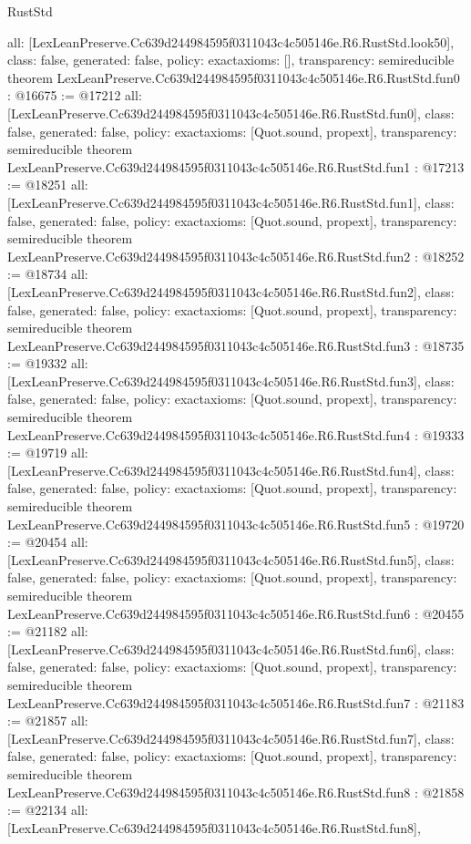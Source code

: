\begin{lexlean}{RustStd}
\begin{coremodule}
{  all: [LexLeanPreserve.Cc639d244984595f0311043c4c505146e.R6.RustStd.look50],
  class: false,
  generated: false,
  policy: exact{axioms: []},
  transparency: semireducible
}
theorem LexLeanPreserve.Cc639d244984595f0311043c4c505146e.R6.RustStd.fun0 : @16675 := @17212 {
  all: [LexLeanPreserve.Cc639d244984595f0311043c4c505146e.R6.RustStd.fun0],
  class: false,
  generated: false,
  policy: exact{axioms: [Quot.sound, propext]},
  transparency: semireducible
}
theorem LexLeanPreserve.Cc639d244984595f0311043c4c505146e.R6.RustStd.fun1 : @17213 := @18251 {
  all: [LexLeanPreserve.Cc639d244984595f0311043c4c505146e.R6.RustStd.fun1],
  class: false,
  generated: false,
  policy: exact{axioms: [Quot.sound, propext]},
  transparency: semireducible
}
theorem LexLeanPreserve.Cc639d244984595f0311043c4c505146e.R6.RustStd.fun2 : @18252 := @18734 {
  all: [LexLeanPreserve.Cc639d244984595f0311043c4c505146e.R6.RustStd.fun2],
  class: false,
  generated: false,
  policy: exact{axioms: [Quot.sound, propext]},
  transparency: semireducible
}
theorem LexLeanPreserve.Cc639d244984595f0311043c4c505146e.R6.RustStd.fun3 : @18735 := @19332 {
  all: [LexLeanPreserve.Cc639d244984595f0311043c4c505146e.R6.RustStd.fun3],
  class: false,
  generated: false,
  policy: exact{axioms: [Quot.sound, propext]},
  transparency: semireducible
}
theorem LexLeanPreserve.Cc639d244984595f0311043c4c505146e.R6.RustStd.fun4 : @19333 := @19719 {
  all: [LexLeanPreserve.Cc639d244984595f0311043c4c505146e.R6.RustStd.fun4],
  class: false,
  generated: false,
  policy: exact{axioms: [Quot.sound, propext]},
  transparency: semireducible
}
theorem LexLeanPreserve.Cc639d244984595f0311043c4c505146e.R6.RustStd.fun5 : @19720 := @20454 {
  all: [LexLeanPreserve.Cc639d244984595f0311043c4c505146e.R6.RustStd.fun5],
  class: false,
  generated: false,
  policy: exact{axioms: [Quot.sound, propext]},
  transparency: semireducible
}
theorem LexLeanPreserve.Cc639d244984595f0311043c4c505146e.R6.RustStd.fun6 : @20455 := @21182 {
  all: [LexLeanPreserve.Cc639d244984595f0311043c4c505146e.R6.RustStd.fun6],
  class: false,
  generated: false,
  policy: exact{axioms: [Quot.sound, propext]},
  transparency: semireducible
}
theorem LexLeanPreserve.Cc639d244984595f0311043c4c505146e.R6.RustStd.fun7 : @21183 := @21857 {
  all: [LexLeanPreserve.Cc639d244984595f0311043c4c505146e.R6.RustStd.fun7],
  class: false,
  generated: false,
  policy: exact{axioms: [Quot.sound, propext]},
  transparency: semireducible
}
theorem LexLeanPreserve.Cc639d244984595f0311043c4c505146e.R6.RustStd.fun8 : @21858 := @22134 {
  all: [LexLeanPreserve.Cc639d244984595f0311043c4c505146e.R6.RustStd.fun8],
}
\end{coremodule}
\end{lexlean}
